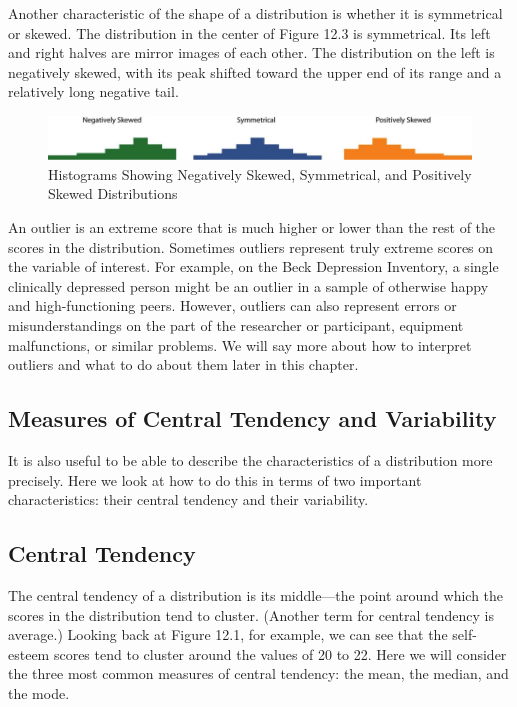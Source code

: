 Another characteristic of the shape of a distribution is whether it is symmetrical or skewed. The distribution in the center of Figure 12.3 is symmetrical. Its left and right halves are mirror images of each other. The distribution on the left is negatively skewed, with its peak shifted toward the upper end of its range and a relatively long negative
tail.

\begin{figure}
\includegraphics[width=\linewidth]{figures/Fig123}
\caption{Histograms Showing Negatively Skewed, Symmetrical, and Positively Skewed Distributions}
\label{fig:skew}
\end{figure}

An outlier is an extreme score that is much higher or lower than the rest of the scores in the distribution. Sometimes outliers represent truly extreme scores on the variable of interest. For example, on the Beck Depression Inventory, a single clinically depressed person might be an outlier in a sample of otherwise happy and high-functioning peers. However, outliers can also represent errors or misunderstandings on the part of the researcher or participant, equipment malfunctions, or similar problems. We will say more about how to interpret outliers and what to do about them later in this chapter.



\subsection{Measures of Central Tendency and Variability}

It is also useful to be able to describe the characteristics of a distribution more precisely. Here we look at how to do this in terms of two important characteristics: their central tendency and their variability.



\subsection{Central Tendency}

The central tendency of a distribution is its middle---the point around which the scores in the distribution tend to cluster. (Another term for central tendency is average.) Looking back at Figure 12.1, for example, we can see that the self-esteem scores tend to cluster around the values of 20 to 22. Here we will consider the three most common measures of central tendency: the mean, the median, and the mode.


